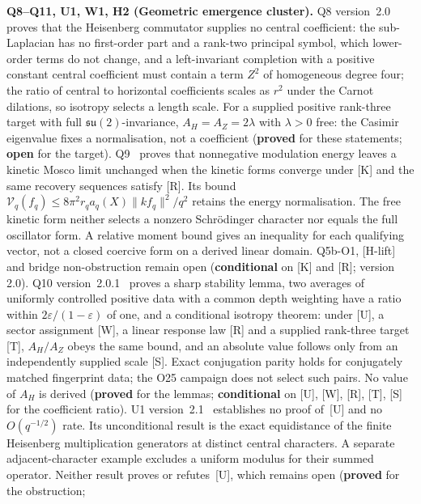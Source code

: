 \documentclass[11pt,a4paper]{article}
\newcommand{\sproved}{\textcolor{cproved}{\textbf{proved}}}
\newcommand{\sopen}{\textcolor{copen}{\textbf{open}}}
\newcommand{\scond}{\textcolor{ccond}{\textbf{conditional}}}
\begin{document}
    \textbf{Q8--Q11, U1, W1, H2 (Geometric emergence cluster).}
    Q8 version~2.0~\cite{BeauQ8} proves that the Heisenberg commutator supplies no central coefficient: the
    sub-Laplacian has no first-order part and a rank-two principal symbol, which lower-order terms do not
    change, and a left-invariant completion with a positive constant central coefficient must contain a term
    $Z^2$ of homogeneous degree four; the ratio of central to horizontal coefficients scales as $r^2$ under
    the Carnot dilations, so isotropy selects a length scale.
    For a supplied positive rank-three target with full $\mathfrak{su}(2)$-invariance,
    $A_H = A_Z = 2\lambda$ with $\lambda > 0$ free: the Casimir eigenvalue fixes a normalisation, not a
    coefficient (\sproved{} for these statements; \sopen{} for the target).
    Q9~\cite{Beau2026q9} proves that nonnegative modulation energy leaves a kinetic Mosco limit
    unchanged when the kinetic forms converge under [K] and the same recovery sequences satisfy
    [R]. Its bound $\mathcal V_q(f_q)\leq8\pi^2r_q a_q(X)\|kf_q\|^2/q^2$ retains the energy
    normalisation. The free kinetic form neither selects a nonzero Schr\"odinger character nor
    equals the full oscillator form. A relative moment bound gives an inequality for each
    qualifying vector, not a closed coercive form on a derived linear domain.
    Q5b-O1, [H-lift] and bridge non-obstruction remain open
    (\scond{} on [K] and [R]; version 2.0).
    Q10 version~2.0.1~\cite{Beau2026q10} proves a sharp stability lemma, two averages of uniformly
    controlled positive data with a common depth weighting have a ratio within
    $2\varepsilon/(1-\varepsilon)$ of one, and a conditional isotropy theorem: under [U], a sector
    assignment [W], a linear response law [R] and a supplied rank-three target [T], $A_H/A_Z$ obeys the same
    bound, and an absolute value follows only from an independently supplied scale [S].
    Exact conjugation parity holds for conjugately matched fingerprint data; the O25 campaign does not
    select such pairs.
    No value of $A_H$ is derived (\sproved{} for the lemmas; \scond{} on [U], [W], [R], [T], [S] for the
    coefficient ratio).
    U1 version~2.1~\cite{Beau2026u1} establishes no proof of~[U] and no
    $O(q^{-1/2})$ rate. Its unconditional result is the exact equidistance of the finite
    Heisenberg multiplication generators at distinct central characters. A separate
    adjacent-character example excludes a uniform modulus for their summed operator.
    Neither result proves or refutes~[U], which remains open (\sproved{} for the obstruction;
\end{document}
